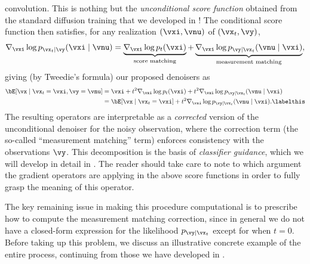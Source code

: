 \documentclass[../../book-main.tex]{subfiles}
\begin{document}
convolution. This is nothing but the \textit{unconditional score function}
obtained from the standard diffusion training that we developed in
!
The conditional score function then satisfies, for any realization $(\vxi,
\vnu)$ of $(\vx_t, \vy)$,
\begin{equation}
    \nabla_{\vxi} \log p_{\vx_t \mid \vy}(\vxi\mid \vnu)
    =
    \underbrace{\nabla_{\vxi} \log p_t(\vxi)}_{\text{score matching}}
    +
    \underbrace{\nabla_{\vxi} \log p_{\vy \mid \vx_t}(\vnu \mid
    \vxi)}_{\text{measurement matching}},
    \label{eqn:conditional-denoising-score}
\end{equation}
giving (by Tweedie's formula) our proposed denoisers as
\begin{align*}
    \bE[ \vx \mid \vx_t=\vxi, \vy=\vnu]
    &=
    \vxi + t^2 \nabla_{\vxi}\log p_t(\vxi) + t^2 \nabla_{\vxi}\log p_{\vy \mid
    \vx_t}(\vnu \mid \vxi)
    \\
    &=
    \bE[\vx \mid \vx_t=\vxi] + t^2 \nabla_{\vxi}\log p_{\vy \mid \vx_t}(\vnu\mid
    \vxi).
    \labelthis \label{eq:posterior-sampling-denoiser-decomposition}
\end{align*}
The resulting operators are interpretable as a \textit{corrected} version of the
unconditional denoiser for the noisy observation, where the correction term (the
so-called ``measurement matching'' term) enforces consistency with the
observations $\vy$. This decomposition is the basis of \textit{classifier
guidance}, which we will develop in detail in . The reader should take care to note to which argument the
gradient operators are applying in the above score functions in order to fully
grasp the meaning of this operator.

The key remaining issue in making this procedure computational is to prescribe
how to compute the measurement matching correction, since in general we do not
have a closed-form
expression for the likelihood $p_{\vy \mid \vx_t}$ except for when $t
= 0$. Before taking up this problem, we discuss an illustrative concrete example
of the entire process, continuing from those we have developed in
.
\end{document}
